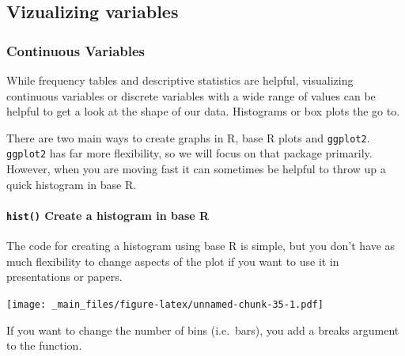 \documentclass[
]{book}
\newenvironment{Shaded}{\begin{snugshade}}{\end{snugshade}}
\newcommand{\AttributeTok}[1]{\textcolor[rgb]{0.77,0.63,0.00}{#1}}
\newcommand{\DecValTok}[1]{\textcolor[rgb]{0.00,0.00,0.81}{#1}}
\newcommand{\FunctionTok}[1]{\textcolor[rgb]{0.00,0.00,0.00}{#1}}
\newcommand{\NormalTok}[1]{#1}
\newcommand{\SpecialCharTok}[1]{\textcolor[rgb]{0.00,0.00,0.00}{#1}}
\begin{document}
\hypertarget{vizualizing-variables-1}{%
\subsection*{Vizualizing variables}\label{vizualizing-variables-1}}

\hypertarget{continuous-variables-1}{%
\subsubsection*{Continuous Variables}\label{continuous-variables-1}}

While frequency tables and descriptive statistics are helpful, visualizing continuous variables or discrete variables with a wide range of values can be helpful to get a look at the shape of our data. Histograms or box plots the go to.

There are two main ways to create graphs in R, base R plots and \texttt{ggplot2}. \texttt{ggplot2} has far more flexibility, so we will focus on that package primarily. However, when you are moving fast it can sometimes be helpful to throw up a quick histogram in base R.

\hypertarget{hist}{%
\paragraph*{\texorpdfstring{\texttt{hist()} Create a histogram in base R}{hist() Create a histogram in base R}}\label{hist}}

The code for creating a histogram using base R is simple, but you don't have as much flexibility to change aspects of the plot if you want to use it in presentations or papers.

\begin{Shaded}
\end{Shaded}

\texttt{[image: \_main\_files/figure-latex/unnamed-chunk-35-1.pdf]}

If you want to change the number of bins (i.e.~bars), you add a breaks argument to the function.

\begin{Shaded}
\end{Shaded}
\end{document}
